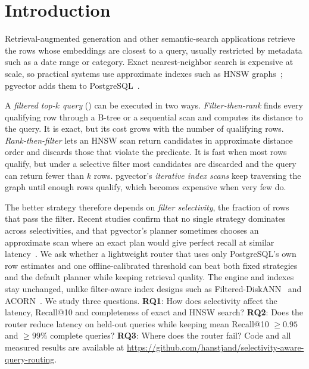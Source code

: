 \section{Introduction}
\label{sec:intro}

Retrieval-augmented generation and other semantic-search applications retrieve the rows whose embeddings are closest
to a query, usually restricted by metadata such as a date range or category. Exact nearest-neighbor search is
expensive at scale, so practical systems use approximate indexes such as HNSW graphs~\cite{malkov2020hnsw}; pgvector
adds them to PostgreSQL~\cite{pgvector}.

A \emph{filtered top-$k$ query} () can be executed
in two ways. \emph{Filter-then-rank} finds every qualifying row through a B-tree or a sequential scan and computes its
distance to the query. It is exact, but its cost grows with the number of qualifying rows. \emph{Rank-then-filter}
lets an HNSW scan return candidates in approximate distance order and discards those that violate the predicate. It is
fast when most rows qualify, but under a selective filter most candidates are discarded and the query can return
fewer than $k$ rows. pgvector's \emph{iterative index scans} keep traversing the graph until enough rows qualify,
which becomes expensive when very few do.

The better strategy therefore depends on \emph{filter selectivity}, the fraction of rows that pass the filter. Recent
studies confirm that no single strategy dominates across selectivities, and that pgvector's planner sometimes chooses
an approximate scan where an exact plan would give perfect recall at similar latency~\cite{li2025attribute,
amanbayev2026filtered}. We ask whether a lightweight router that uses only PostgreSQL's own row estimates and one
offline-calibrated threshold can beat both fixed strategies and the default planner while keeping retrieval quality.
The engine and indexes stay unchanged, unlike filter-aware index designs such as
Filtered-DiskANN~\cite{gollapudi2023filtered} and ACORN~\cite{patel2024acorn}. We study three questions.
\textbf{RQ1}: How does selectivity affect the latency, Recall@10 and completeness of exact and HNSW search?
\textbf{RQ2}: Does the router reduce latency on held-out queries while keeping mean Recall@10 $\ge0.95$ and
$\ge99\%$ complete queries?
\textbf{RQ3}: Where does the router fail? Code and all measured results are available at
\url{https://github.com/hanstjand/selectivity-aware-query-routing}.
